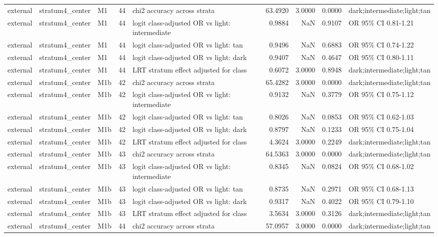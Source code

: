 \begin{tabular}{lllrlrrrl}
external & stratum4\_center & M1 & 44 & chi2 accuracy across strata & 63.4920 & 3.0000 & 0.0000 & dark;intermediate;light;tan \\
external & stratum4\_center & M1 & 44 & logit class-adjusted OR vs light: intermediate & 0.9884 & NaN & 0.9107 & OR 95\% CI 0.81-1.21 \\
external & stratum4\_center & M1 & 44 & logit class-adjusted OR vs light: tan & 0.9496 & NaN & 0.6883 & OR 95\% CI 0.74-1.22 \\
external & stratum4\_center & M1 & 44 & logit class-adjusted OR vs light: dark & 0.9407 & NaN & 0.4647 & OR 95\% CI 0.80-1.11 \\
external & stratum4\_center & M1 & 44 & LRT stratum effect adjusted for class & 0.6072 & 3.0000 & 0.8948 & dark;intermediate;light;tan \\
external & stratum4\_center & M1b & 42 & chi2 accuracy across strata & 65.4282 & 3.0000 & 0.0000 & dark;intermediate;light;tan \\
external & stratum4\_center & M1b & 42 & logit class-adjusted OR vs light: intermediate & 0.9132 & NaN & 0.3779 & OR 95\% CI 0.75-1.12 \\
external & stratum4\_center & M1b & 42 & logit class-adjusted OR vs light: tan & 0.8026 & NaN & 0.0853 & OR 95\% CI 0.62-1.03 \\
external & stratum4\_center & M1b & 42 & logit class-adjusted OR vs light: dark & 0.8797 & NaN & 0.1233 & OR 95\% CI 0.75-1.04 \\
external & stratum4\_center & M1b & 42 & LRT stratum effect adjusted for class & 4.3624 & 3.0000 & 0.2249 & dark;intermediate;light;tan \\
external & stratum4\_center & M1b & 43 & chi2 accuracy across strata & 64.5363 & 3.0000 & 0.0000 & dark;intermediate;light;tan \\
external & stratum4\_center & M1b & 43 & logit class-adjusted OR vs light: intermediate & 0.8345 & NaN & 0.0824 & OR 95\% CI 0.68-1.02 \\
external & stratum4\_center & M1b & 43 & logit class-adjusted OR vs light: tan & 0.8735 & NaN & 0.2971 & OR 95\% CI 0.68-1.13 \\
external & stratum4\_center & M1b & 43 & logit class-adjusted OR vs light: dark & 0.9317 & NaN & 0.4022 & OR 95\% CI 0.79-1.10 \\
external & stratum4\_center & M1b & 43 & LRT stratum effect adjusted for class & 3.5634 & 3.0000 & 0.3126 & dark;intermediate;light;tan \\
external & stratum4\_center & M1b & 44 & chi2 accuracy across strata & 57.0957 & 3.0000 & 0.0000 & dark;intermediate;light;tan \\

\end{tabular}
